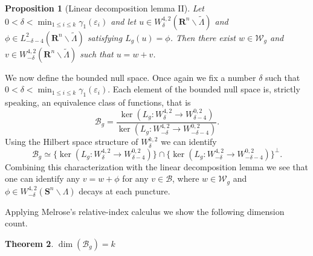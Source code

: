 \documentclass[reqno,11pt]{amsart}
\newtheorem{theorem}{Theorem}
\newtheorem{proposition}[theorem]{Proposition}
\theoremstyle{tttheorem}
\newcommand{\Ss}{\mathbf{S}}
\newcommand{\R}{\mathbf{R}}
\begin{document}
\begin{proposition}[Linear decomposition lemma II] 
Let $0 < \delta < \min_{1 \leq i \leq k} \gamma_1(\varepsilon_i)$ and 
let $u\in W^{4,2}_\delta(\R^n \backslash \widetilde \Lambda)$ and 
$\phi \in L^2_{-\delta-4}(\R^n \backslash \widetilde \Lambda)$ satisfying 
$L_g(u) = \phi$. Then there exist $w \in \mathcal{W}_g$ and $v\in 
W^{4,2}_{-\delta}(\R^n \backslash \widetilde \Lambda)$ such that $u=w+v$. 
\end{proposition} 

We now define the bounded null space. Once again we 
fix a number $\delta$ such that $0 < \delta < \min_{1\leq i \leq k} 
\gamma_1(\varepsilon_i)$. Each element of the bounded
null space is, strictly speaking, an equivalence class of functions, 
that is
$$\mathcal{B}_g = \frac{\ker (L_g : W^{4,2}_\delta \rightarrow W^{0,2}_{\delta-4})}
{\ker(L_g: W^{4,2}_{-\delta} \rightarrow W^{0,2}_{-\delta-4})}.$$
Using the Hilbert space structure of $W^{k,2}_\delta$ we can 
identify 
$$\mathcal{B}_g \simeq \{ \ker(L_g: W^{4,2}_\delta\rightarrow 
W^{0,2}_{\delta-4})\} \cap \{ \ker(L_g:W^{4,2}_{-\delta} \rightarrow 
W^{0,2}_{-\delta-4}) \}^\perp.$$
Combining this characterization with the linear decomposition lemma we 
see that one can identify any $v = w+\phi$ for any $v\in \mathcal{B}$, 
where $w \in \mathcal{W}_g$ and $\phi \in W^{4,2}_{-\delta}(\Ss^n 
\backslash \Lambda)$ decays at each puncture. 

Applying Melrose's relative-index calculus we show 
the following dimension count.  
\begin{theorem} 
$\dim(\mathcal{B}_g) = k$
\end{theorem} 
\end{document}
